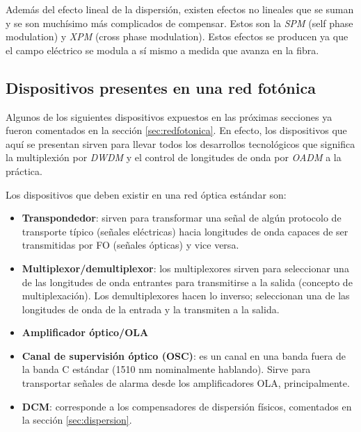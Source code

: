 Además del efecto lineal de la dispersión, existen efectos no lineales
que se suman y se son muchísimo más complicados de compensar. Estos
son la \emph{SPM} (self phase modulation) y \emph{XPM} (cross phase
modulation). Estos efectos se producen ya que el campo eléctrico se
modula a sí mismo a medida que avanza en la fibra.

\subsection{Dispositivos presentes en una red fotónica}
\label{sec:dispositivos}

Algunos de los siguientes dispositivos expuestos en las próximas
secciones ya fueron comentados en la sección \ref{sec:redfotonica}. En
efecto, los dispositivos que aquí se presentan sirven para llevar
todos los desarrollos tecnológicos que significa la multiplexión por
\emph{DWDM} y el control de longitudes de onda por \emph{OADM} a la
práctica.

Los dispositivos que deben existir en una red óptica estándar son:
\begin{itemize}
\item \textbf{Transpondedor}: sirven para transformar una señal de
  algún protocolo de transporte típico (señales eléctricas) hacia
  longitudes de onda capaces de ser transmitidas por FO (señales
  ópticas) y vice versa.
\item \textbf{Multiplexor/demultiplexor}: los multiplexores sirven
  para seleccionar una de las longitudes de onda entrantes para
  transmitirse a la salida (concepto de multiplexación). Los
  demultiplexores hacen lo inverso; seleccionan una de las longitudes
  de onda de la entrada y la transmiten a la salida.
\item \textbf{Amplificador óptico/OLA}
\item \textbf{Canal de supervisión óptico (OSC)}: es un canal en una
  banda fuera de la banda C estándar (1510 nm nominalmente
  hablando). Sirve para transportar señales de alarma desde los
  amplificadores OLA, principalmente.
\item \textbf{DCM}: corresponde a los compensadores de dispersión
  físicos, comentados en la sección \ref{sec:dispersion}.
\end{itemize}